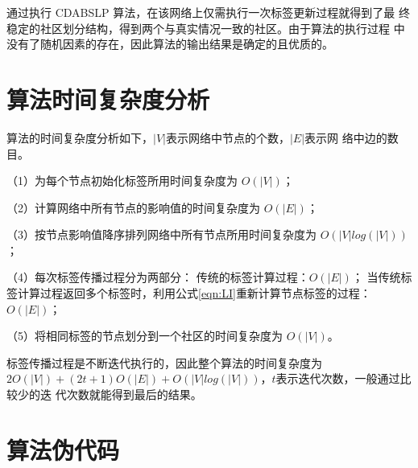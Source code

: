 通过执行 CDABSLP 算法，在该网络上仅需执行一次标签更新过程就得到了最
终稳定的社区划分结构，得到两个与真实情况一致的社区。由于算法的执行过程
中没有了随机因素的存在，因此算法的输出结果是确定的且优质的。 

\section{算法时间复杂度分析}
算法的时间复杂度分析如下，$|V|$表示网络中节点的个数，$|E|$表示网
络中边的数目。 

（1）为每个节点初始化标签所用时间复杂度为 $O(|V|)$； 

（2）计算网络中所有节点的影响值的时间复杂度为 $O(|E|)$； 

（3）按节点影响值降序排列网络中所有节点所用时间复杂度为
$O(|V|log(|V|))$；

（4）每次标签传播过程分为两部分： 传统的标签计算过程：$O(|E|)$； 当传统标签计算过程返回多个标签时，利用公式\ref{eqn:LI}重新计算节点标签的过程：$O(|E|)$； 

（5）将相同标签的节点划分到一个社区的时间复杂度为 $O(|V|)$。 

标签传播过程是不断迭代执行的，因此整个算法的时间复杂度为
$2O(|V|)+(2t+1)O(|E|)+O(|V|log(|V|))$，$t $表示迭代次数，一般通过比较少的迭
代次数就能得到最后的结果。 

\section{算法伪代码}